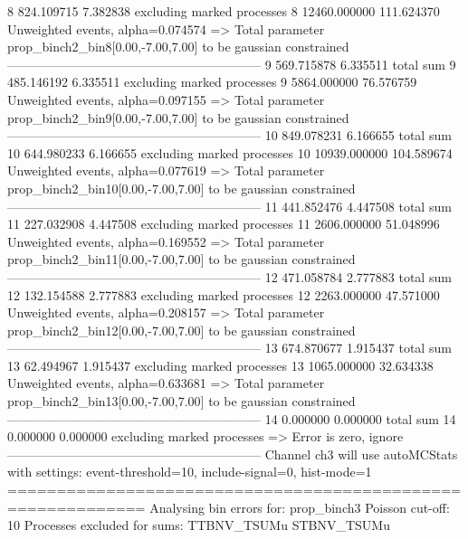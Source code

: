 8          824.109715      7.382838        excluding marked processes    
8          12460.000000    111.624370      Unweighted events, alpha=0.074574
  => Total parameter prop_binch2_bin8[0.00,-7.00,7.00] to be gaussian constrained
------------------------------------------------------------
9          569.715878      6.335511        total sum                     
9          485.146192      6.335511        excluding marked processes    
9          5864.000000     76.576759       Unweighted events, alpha=0.097155
  => Total parameter prop_binch2_bin9[0.00,-7.00,7.00] to be gaussian constrained
------------------------------------------------------------
10         849.078231      6.166655        total sum                     
10         644.980233      6.166655        excluding marked processes    
10         10939.000000    104.589674      Unweighted events, alpha=0.077619
  => Total parameter prop_binch2_bin10[0.00,-7.00,7.00] to be gaussian constrained
------------------------------------------------------------
11         441.852476      4.447508        total sum                     
11         227.032908      4.447508        excluding marked processes    
11         2606.000000     51.048996       Unweighted events, alpha=0.169552
  => Total parameter prop_binch2_bin11[0.00,-7.00,7.00] to be gaussian constrained
------------------------------------------------------------
12         471.058784      2.777883        total sum                     
12         132.154588      2.777883        excluding marked processes    
12         2263.000000     47.571000       Unweighted events, alpha=0.208157
  => Total parameter prop_binch2_bin12[0.00,-7.00,7.00] to be gaussian constrained
------------------------------------------------------------
13         674.870677      1.915437        total sum                     
13         62.494967       1.915437        excluding marked processes    
13         1065.000000     32.634338       Unweighted events, alpha=0.633681
  => Total parameter prop_binch2_bin13[0.00,-7.00,7.00] to be gaussian constrained
------------------------------------------------------------
14         0.000000        0.000000        total sum                     
14         0.000000        0.000000        excluding marked processes    
  => Error is zero, ignore      
------------------------------------------------------------
Channel ch3 will use autoMCStats with settings: event-threshold=10, include-signal=0, hist-mode=1
============================================================
Analysing bin errors for: prop_binch3
Poisson cut-off: 10
Processes excluded for sums: TTBNV_TSUMu STBNV_TSUMu
